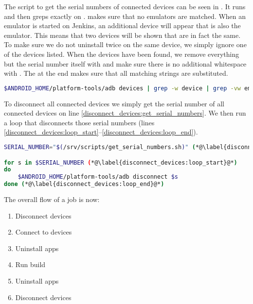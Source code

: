 \begin{description}
  The script to get the serial numbers of connected devices can be seen in . It runs  and then {grep}s exactly on .  makes sure that no emulators are matched. When an emulator is started on Jenkins, an additional device will appear that is also the emulator. This means that two devices will be shown that are in fact the same. To make sure we do not uninstall twice on the same device, we simply ignore one of the devices listed. When the devices have been found, we remove everything but the serial number itself with  and make sure there is no additional whitespace with . The  at the end makes sure that all matching strings are substituted.

  \begin{lstlisting}[language=bash,caption=Script that gets the serial numbers of all connected devices,label=lst:get_serial_numbers]
  $ANDROID_HOME/platform-tools/adb devices | grep -w device | grep -vw emulator | sed 's/\s*device//' | sed 's/\s*//g'
  \end{lstlisting}
  \item[Disconnection Script] To disconnect all connected devices we simply get the serial number of all connected devices on line \ref{disconnect_devices:get_serial_numbers}. We then run a loop that disconnects those serial numbers (lines \ref{disconnect_devices:loop_start}--\ref{disconnect_devices:loop_end}).
  \begin{lstlisting}[language=bash,caption=Script that disconnects all connected devices,label=lst:disconnect_devices]
SERIAL_NUMBER="$(/srv/scripts/get_serial_numbers.sh)" (*@\label{disconnect_devices:get_serial_numbers}@*)

for s in $SERIAL_NUMBER (*@\label{disconnect_devices:loop_start}@*)
do
    $ANDROID_HOME/platform-tools/adb disconnect $s
done (*@\label{disconnect_devices:loop_end}@*)
  \end{lstlisting}
\end{description}

The overall flow of a job is now:

\begin{enumerate}
  \item Disconnect devices
  \item Connect to devices
  \item Uninstall apps
  \item Run build
  \item Uninstall apps
  \item Disconnect devices
\end{enumerate}

